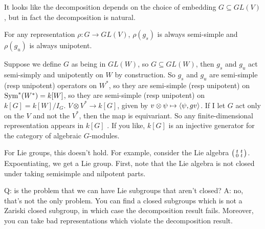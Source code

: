 It looks like the decomposition depends on the choice of embedding $G\subseteq GL(V)$, but in fact the decomposition is natural.
\begin{remark}
 For any representation $\rho\colon G\to GL(V)$, $\rho(g_s)$ is always semi-simple and $\rho(g_u)$ is always unipotent.
 
 Suppose we define $G$ as being in $GL(W)$, so $G\subseteq GL(W)$, then $g_s$ and $g_u$ act semi-simply and unipotently on $W$ by construction. So $g_s$ and $g_u$ are semi-simple (resp unipotent) operators on $W^*$, so they are semi-simple (resp unipotent) on $\operatorname{Sym}^*(W^*)=k[W]$, so they are semi-simple (resp unipotent) on $k[G]=k[W]/I_G$. $V\otimes V^*\to k[G]$, given by $v\otimes \psi\mapsto \langle\psi,gv\rangle$. If I let $G$ act only on the $V$ and not the $V^*$, then the map is equivariant. So any finite-dimensional representation appears in $k[G]$ . If you like, $k[G]$ is an injective generator for the category of algebraic $G$-modules.
\end{remark}
For Lie groups, this doesn't hold. For example, consider the Lie algebra $\bigl(\begin{smallmatrix} t&t\\ 0&t \end{smallmatrix}\bigr)$. Expoentiating, we get a Lie group. First, note that the Lie algebra is not closed under taking semisimple and nilpotent parts.

Q: is the problem that we can have Lie subgroups that aren't closed? A: no, that's not the only problem. You can find a closed subgroups which is not a Zariski closed subgroup, in which case the decomposition result fails. Moreover, you can take bad representations which violate the decomposition result.